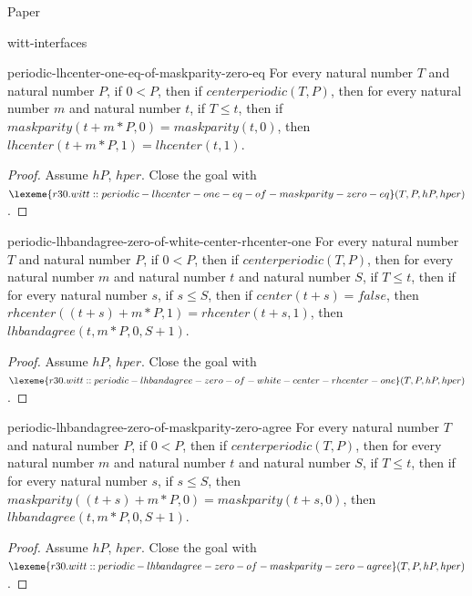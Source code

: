 \begin{lexlean}{Paper}
\begin{section}{witt-interfaces}
  \begin{theorem}{periodic-lhcenter-one-eq-of-maskparity-zero-eq}
  For every natural number \(T\) and natural number \(P\), if \(0 < P\), then if \(centerperiodic(T, P)\), then for every natural number \(m\) and natural number \(t\), if \(T ≤ t\), then if \(maskparity(t + m * P, 0) = maskparity(t, 0)\), then \(lhcenter(t + m * P, 1) = lhcenter(t, 1)\).
  \begin{proof}
  Assume \(hP\), \(hper\).
  Close the goal with \(\lexeme{r30.witt::periodic-lhcenter-one-eq-of-maskparity-zero-eq}(T, P, hP, hper)\).
  \end{proof}
  \end{theorem}

  \begin{theorem}{periodic-lhbandagree-zero-of-white-center-rhcenter-one}
  For every natural number \(T\) and natural number \(P\), if \(0 < P\), then if \(centerperiodic(T, P)\), then for every natural number \(m\) and natural number \(t\) and natural number \(S\), if \(T ≤ t\), then if for every natural number \(s\), if \(s ≤ S\), then if \(center(t + s) = false\), then \(rhcenter((t + s) + m * P, 1) = rhcenter(t + s, 1)\), then \(lhbandagree(t, m * P, 0, S + 1)\).
  \begin{proof}
  Assume \(hP\), \(hper\).
  Close the goal with \(\lexeme{r30.witt::periodic-lhbandagree-zero-of-white-center-rhcenter-one}(T, P, hP, hper)\).
  \end{proof}
  \end{theorem}

  \begin{theorem}{periodic-lhbandagree-zero-of-maskparity-zero-agree}
  For every natural number \(T\) and natural number \(P\), if \(0 < P\), then if \(centerperiodic(T, P)\), then for every natural number \(m\) and natural number \(t\) and natural number \(S\), if \(T ≤ t\), then if for every natural number \(s\), if \(s ≤ S\), then \(maskparity((t + s) + m * P, 0) = maskparity(t + s, 0)\), then \(lhbandagree(t, m * P, 0, S + 1)\).
  \begin{proof}
  Assume \(hP\), \(hper\).
  Close the goal with \(\lexeme{r30.witt::periodic-lhbandagree-zero-of-maskparity-zero-agree}(T, P, hP, hper)\).
  \end{proof}
  \end{theorem}


\end{section}
\end{lexlean}
